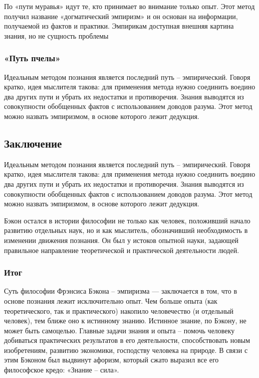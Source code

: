 \documentclass[
]{article}
\begin{document}
По «пути муравья» идут те, кто принимает во внимание только опыт. Этот
метод получил название «догматический эмпиризм» и он основан на
информации, получаемой из фактов и практики. Эмпирикам доступная внешняя
картина знания, но не сущность проблемы

\hypertarget{ux43fux443ux442ux44c-ux43fux447ux435ux43bux44b}{%
\subsubsection{«Путь
пчелы»}\label{ux43fux443ux442ux44c-ux43fux447ux435ux43bux44b}}

Идеальным методом познания является последний путь -- эмпирический.
Говоря кратко, идея мыслителя такова: для применения метода нужно
соединить воедино два других пути и убрать их недостатки и противоречия.
Знания выводятся из совокупности обобщенных фактов с использованием
доводов разума. Этот метод можно назвать эмпиризмом, в основе которого
лежит дедукция.

\hypertarget{ux437ux430ux43aux43bux44eux447ux435ux43dux438ux435-7}{%
\subsection{Заключение}\label{ux437ux430ux43aux43bux44eux447ux435ux43dux438ux435-7}}

Идеальным методом познания является последний путь -- эмпирический.
Говоря кратко, идея мыслителя такова: для применения метода нужно
соединить воедино два других пути и убрать их недостатки и противоречия.
Знания выводятся из совокупности обобщенных фактов с использованием
доводов разума. Этот метод можно назвать эмпиризмом, в основе которого
лежит дедукция.

Бэкон остался в истории философии не только как человек, положивший
начало развитию отдельных наук, но и как мыслитель, обозначивший
необходимость в изменении движения познания. Он был у истоков опытной
науки, задающей правильное направление теоретической и практической
деятельности людей.

\hypertarget{ux438ux442ux43eux433-9}{%
\subsubsection{Итог}\label{ux438ux442ux43eux433-9}}

Суть философии Фрэнсиса Бэкона -- эмпиризма --- заключается в том, что в
основе познания лежит исключительно опыт. Чем больше опыта (как
теоретического, так и практического) накопило человечество (и отдельный
человек), тем ближе оно к истинному знанию. Истинное знание, по Бэкону,
не может быть самоцелью. Главные задачи знания и опыта -- помочь
человеку добиваться практических результатов в его деятельности,
способствовать новым изобретениям, развитию экономики, господству
человека на природе. В связи с этим Бэконом был выдвинут афоризм,
который сжато выразил все его философское кредо: «Знание -- сила».
\end{document}
